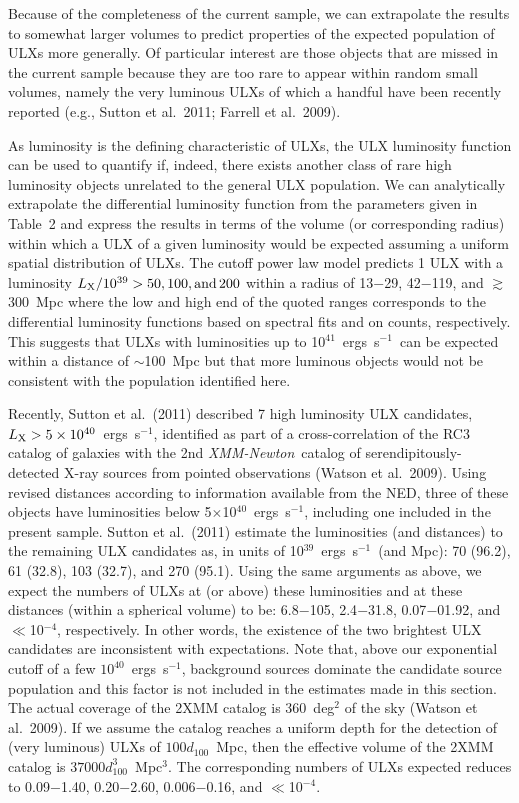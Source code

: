 \documentclass{article}
\newcommand{\ergl}{ergs~s$^{-1}$}
\newcommand{\xmm}{{\sl XMM-Newton}}
\newcommand{\etal}{et al.}
\begin{document}
Because of the completeness of the current sample, 
 we can extrapolate the results to somewhat larger volumes
 to predict properties of the expected population of ULXs more generally.
Of particular interest are those objects that are missed in the current
 sample because they are too rare to appear within random small volumes, namely the very luminous ULXs
 of which a handful have been recently reported (e.g., Sutton \etal\ 2011; Farrell \etal\ 2009).

As luminosity is the defining characteristic of ULXs, 
 the ULX luminosity function can be used to quantify if, indeed, there exists another class of rare high luminosity 
 objects unrelated to the general ULX population.
% 
We can analytically extrapolate the differential luminosity function from the parameters given in Table~2
 and express the results in terms of the volume (or corresponding radius) within which a ULX of 
 a given luminosity would be expected assuming a uniform spatial distribution of ULXs. 
The cutoff power law model predicts 1 ULX with a luminosity 
 $L_{\rm X}/10^{39} > 50,100, {\rm and \,} 200$ within a radius of
 13$-$29, 42$-$119, and $\gtrsim$300~Mpc where the low  and high end of the quoted
 ranges corresponds to the differential luminosity functions based on spectral fits and on counts, respectively.
This suggests that ULXs with luminosities up to 10$^{41}$~\ergl\ can be expected within a distance of $\sim$100~Mpc
 but that more luminous objects would not be consistent with the population identified here. 
  
Recently, Sutton \etal\ (2011) described 7 high luminosity ULX candidates, $L_{\rm X} > 5\times 10^{40}$~\ergl,
 identified as part of a 
 cross-correlation of the RC3 catalog of galaxies with the 2nd \xmm\ catalog of 
 serendipitously-detected X-ray sources from pointed observations (Watson \etal\ 2009).
Using revised distances according to information available from the NED, three of these objects
have luminosities below 5$\times$10$^{40}$~\ergl, including one included in the present sample.
Sutton \etal\ (2011) estimate the luminosities (and distances) to the remaining ULX candidates as,
 in units of 10$^{39}$~\ergl\ (and Mpc):  70 (96.2), 61 (32.8), 103 (32.7), and 270 (95.1). 
Using the same arguments as above, we expect the numbers of ULXs at (or above) these luminosities
 and at these distances (within a spherical volume)
 to be: 6.8$-$105, 2.4$-$31.8, 0.07$-$01.92, and $\ll$10$^{-4}$, respectively. 
In other words, the existence of the two brightest ULX
 candidates are inconsistent with expectations.
Note that, above our exponential cutoff of a few $10^{40}$~\ergl, background
 sources dominate the candidate source population and this factor is not included in the 
 estimates made in this section.
The actual coverage of the 2XMM catalog is 360~deg$^2$ of the sky (Watson \etal\ 2009). 
If we assume the catalog reaches a uniform depth for the detection of (very luminous) ULXs of 
 $100d_{100}$~Mpc,
 then the effective volume of the 2XMM catalog is $37000 d_{100}^3$~Mpc$^3$.
The corresponding numbers of ULXs expected reduces to 
 0.09$-$1.40, 0.20$-$2.60, 0.006$-$0.16, and $\ll$10$^{-4}$.
\end{document}
